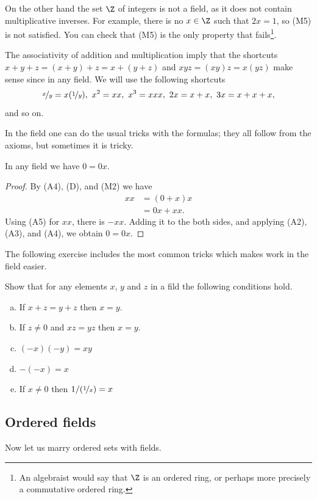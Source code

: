 \documentclass[12pt]{book}
\begin{document}
On the other hand the set $\Z$ of integers is not a field, as it does not contain multiplicative inverses.
For example, there is no $x \in \Z$ such that $2x = 1$, so (M5) is not satisfied.  
You can check that (M5) is the only property that fails\footnote{An algebraist would say that $\Z$ is an ordered ring, or perhaps more precisely a commutative ordered ring.}.

The associativity of addition and multiplication imply that the shortcuts $x+y+z=(x+y)+z=x+(y+z)$ and $xyz=(xy)z=x(yz)$ make sense since in any field. 
We will use the following shortcuts 
\[\nicefrac{x}{y}=x(\nicefrac{1}{y}),\  x^2=xx,\  x^3=xxx,\  2x=x+x,\  3x=x+x+x,\]  
and so on.

In the field one can do the usual tricks with the formulas;
they all follow from the axioms, but sometimes it is tricky.

\begin{example}
In any field we have $0 = 0x$. 
\begin{proof}
By (A4), (D), and (M2) we have
\begin{align*}
xx &= (0+x)x 
\\
&= 0x+xx.
\end{align*}
Using (A5) for $xx$, there is $-xx$.
Adding it to the both sides, and applying (A2), (A3), and (A4), we obtain $0 = 0x$.
\end{proof}
\end{example}

The following exercise includes the most common tricks which makes work in the field easier.

\begin{exercise}
Show that for any elements $x$, $y$ and $z$ in a fild the following conditions hold.
\begin{enumerate}[a)]
\item If $x+z=y+z$ then $x=y$.
\item If $z\ne 0$ and $xz=yz$ then $x=y$.
\item $(-x)(-y)=xy$
\item $-(-x)=x$ 
\item If $x\ne 0$ then $1/(\nicefrac1x)=x$ 
\end{enumerate}
\end{exercise}

\subsection*{Ordered fields}

Now let us marry ordered sets with fields.
\end{document}
